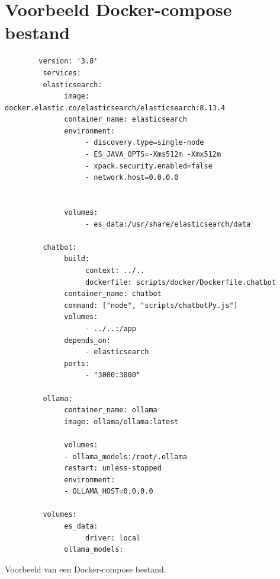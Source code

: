 \section{Voorbeeld Docker-compose bestand}
\begin{listing}[H]
    \begin{verbatim}
        version: '3.8'
         services:
         elasticsearch:
              image: docker.elastic.co/elasticsearch/elasticsearch:8.13.4
              container_name: elasticsearch
              environment:
                   - discovery.type=single-node
                   - ES_JAVA_OPTS=-Xms512m -Xmx512m
                   - xpack.security.enabled=false
                   - network.host=0.0.0.0
              
              
              volumes:
                   - es_data:/usr/share/elasticsearch/data

         chatbot:
              build:
                   context: ../..
                   dockerfile: scripts/docker/Dockerfile.chatbot
              container_name: chatbot
              command: ["node", "scripts/chatbotPy.js"]
              volumes:
                   - ../..:/app
              depends_on:
                   - elasticsearch
              ports:
                   - "3000:3000"

         ollama:
              container_name: ollama
              image: ollama/ollama:latest
              
              volumes:
              - ollama_models:/root/.ollama
              restart: unless-stopped
              environment:
              - OLLAMA_HOST=0.0.0.0

         volumes:
              es_data:
                   driver: local
              ollama_models:
    \end{verbatim}
    \caption[Voorbeeld Docker-compose]{\label{fig:Docker-compose}Voorbeeld van een Docker-compose bestand.}
\end{listing}

